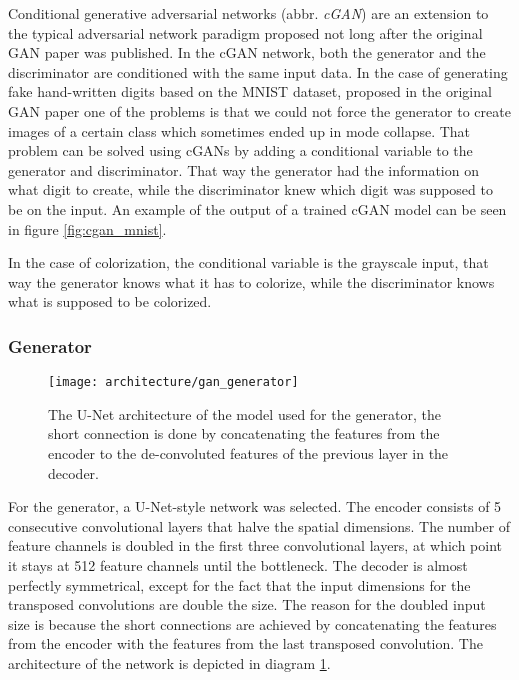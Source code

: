 Conditional generative adversarial networks (abbr. \textit{cGAN})\citep{mirza2014cgan}
are an extension to the typical adversarial network paradigm proposed not long 
after the original GAN paper was published. In the cGAN network, both the generator
and the discriminator are conditioned with the same input data.
In the case of generating fake hand-written digits based on the MNIST \citep{lecun2010mnist}
dataset, proposed in the original GAN paper \citep{goodfellow2014generative}
one of the problems is that we could not force the generator to create images
of a certain class which sometimes ended up in mode collapse. That problem can be 
solved using cGANs by adding a conditional variable to the generator and 
discriminator. That way the generator had the information on what digit to create, 
while the discriminator knew which digit was supposed to be on the input. An 
example of the output of a trained cGAN model can be seen in figure \ref{fig:cgan_mnist}.

In the case of colorization, the conditional variable is the grayscale input, 
that way the generator knows what it has to colorize, while the discriminator
knows what is supposed to be colorized.

\subsubsection{Generator}

\begin{figure}[!ht]
	\centering
	\texttt{[image: architecture/gan\_generator]}
    \caption{The U-Net architecture of the model used for the generator, the short connection
	is done by concatenating the features from the encoder to the de-convoluted features
	of the previous layer in the decoder.}
	\label{fig:architecture_gan}
\end{figure}

For the generator, a U-Net-style network was selected. The encoder consists
of 5 consecutive convolutional layers that halve the spatial dimensions. The 
number of feature channels is doubled in the first three convolutional layers, 
at which point it stays at 512 feature channels until the bottleneck. The decoder
is almost perfectly symmetrical, except for the fact that the input dimensions for 
the transposed convolutions are double the size. The reason for the doubled input
size is because the short connections are achieved by concatenating the features
from the encoder with the features from the last transposed convolution. The architecture
of the network is depicted in diagram \ref{fig:architecture_gan}.

